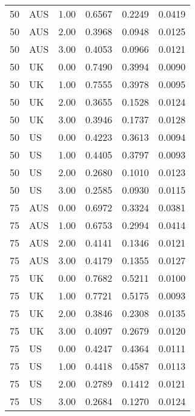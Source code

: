 \begin{table}[ht]
\begin{tabular}{llrlll}
  50 & AUS & 1.00 & 0.6567 & 0.2249 & 0.0419 \\ 
  50 & AUS & 2.00 & 0.3968 & 0.0948 & 0.0125 \\ 
  50 & AUS & 3.00 & 0.4053 & 0.0966 & 0.0121 \\ 
  50 & UK & 0.00 & 0.7490 & 0.3994 & 0.0090 \\ 
  50 & UK & 1.00 & 0.7555 & 0.3978 & 0.0095 \\ 
  50 & UK & 2.00 & 0.3655 & 0.1528 & 0.0124 \\ 
  50 & UK & 3.00 & 0.3946 & 0.1737 & 0.0128 \\ 
  50 & US & 0.00 & 0.4223 & 0.3613 & 0.0094 \\ 
  50 & US & 1.00 & 0.4405 & 0.3797 & 0.0093 \\ 
  50 & US & 2.00 & 0.2680 & 0.1010 & 0.0123 \\ 
  50 & US & 3.00 & 0.2585 & 0.0930 & 0.0115 \\ 
  75 & AUS & 0.00 & 0.6972 & 0.3324 & 0.0381 \\ 
  75 & AUS & 1.00 & 0.6753 & 0.2994 & 0.0414 \\ 
  75 & AUS & 2.00 & 0.4141 & 0.1346 & 0.0121 \\ 
  75 & AUS & 3.00 & 0.4179 & 0.1355 & 0.0127 \\ 
  75 & UK & 0.00 & 0.7682 & 0.5211 & 0.0100 \\ 
  75 & UK & 1.00 & 0.7721 & 0.5175 & 0.0093 \\ 
  75 & UK & 2.00 & 0.3846 & 0.2308 & 0.0135 \\ 
  75 & UK & 3.00 & 0.4097 & 0.2679 & 0.0120 \\ 
  75 & US & 0.00 & 0.4247 & 0.4364 & 0.0111 \\ 
  75 & US & 1.00 & 0.4418 & 0.4587 & 0.0113 \\ 
  75 & US & 2.00 & 0.2789 & 0.1412 & 0.0121 \\ 
  75 & US & 3.00 & 0.2684 & 0.1270 & 0.0124 \\ 
   \hline
\end{tabular}
\end{table}
